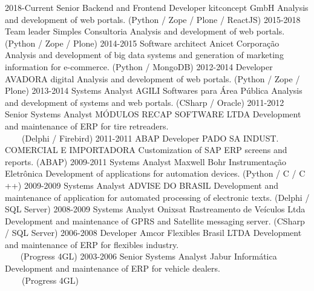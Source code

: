 \documentclass[]{twentysecondcv_en}
\begin{document}
\begin{twenty}
  \twentyitem
    {2018-Current}
    {Senior Backend and Frontend Developer}
    {kitconcept GmbH}
    {Analysis and development of web portals. (Python / Zope / Plone / ReactJS)}
  \twentyitem
    {2015-2018}
    {Team leader}
    {Simples Consultoria}
    {Analysis and development of web portals. (Python / Zope / Plone)}
  \twentyitem
    {2014-2015}
    {Software architect}
    {Anicet Corporação}
    {Analysis and development of big data systems and generation of marketing information for e-commerce. (Python / MongoDB)}
  \twentyitem
    {2012-2014}
    {Developer}
    {AVADORA digital}
    {Analysis and development of web portals. (Python / Zope / Plone)}
  \twentyitem
    {2013-2014}
    {Systems Analyst}
    {AGILI Softwares para Área Pública}
    {Analysis and development of systems and web portals. (CSharp / Oracle)}
  \twentyitem
    {2011-2012}
    {Senior Systems Analyst}
    {MÓDULOS RECAP SOFTWARE LTDA}
    {Development and maintenance of ERP for tire retreaders. \\
    (Delphi / Firebird)}
  \twentyitem
    {2011-2011}
    {ABAP Developer}
    {PADO SA INDUST. COMERCIAL E IMPORTADORA}
    {Customization of SAP ERP screens and reports. (ABAP)}
  \twentyitem
    {2009-2011}
    {Systems Analyst}
    {Maxwell Bohr Instrumentação Eletrônica}
    {Development of applications for automation devices. (Python / C / C ++)}
  \twentyitem
    {2009-2009}
    {Systems Analyst}
    {ADVISE DO BRASIL}
    {Development and maintenance of application for automated processing of electronic texts. (Delphi / SQL Server)}
  \twentyitem
    {2008-2009}
    {Systems Analyst}
    {Onixsat Rastreamento de Veículos Ltda}
    {Development and maintenance of GPRS and Satellite messaging server. (CSharp / SQL Server)}
  \twentyitem
    {2006-2008}
    {Developer}
    {Amcor Flexibles Brasil LTDA}
    {Development and maintenance of ERP for flexibles industry. \\
    (Progress 4GL)}
  \twentyitem
    {2003-2006}
    {Senior Systems Analyst}
    {Jabur Informática}
    {Development and maintenance of ERP for vehicle dealers. \\
    (Progress 4GL)}
\end{twenty}
\end{document}
